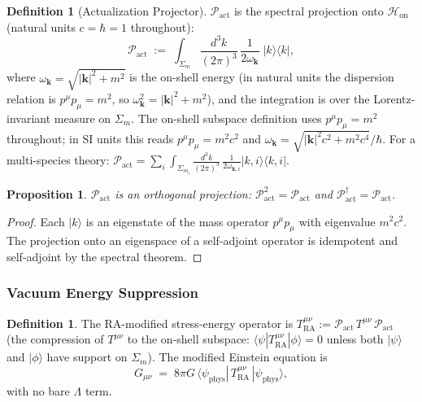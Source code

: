\documentclass[11pt,a4paper]{article}
\theoremstyle{plain}
\newtheorem{proposition}[theorem]{Proposition}
\theoremstyle{definition}
\newtheorem{definition}[theorem]{Definition}
\theoremstyle{remark}
\newcommand{\Pact}{\mathcal{P}_{\mathrm{act}}}
\newcommand{\Hon}{\mathcal{H}_{\mathrm{on}}}
\newcommand{\Sigmam}{\Sigma_{m}}
\newcommand{\Tact}{T^{\mu\nu}_{\mathrm{RA}}}
\newcommand{\ket}[1]{|#1\rangle}
\newcommand{\bra}[1]{\langle #1|}
\begin{document}
\begin{definition}[Actualization Projector]
$\Pact$ is the spectral projection onto $\Hon$ (natural units $c = \hbar = 1$
throughout):
\begin{equation}
  \Pact
  \;:=\;
  \int_{\Sigmam} \frac{d^{3}k}{(2\pi)^{3}}\,\frac{1}{2\omega_{\mathbf{k}}}
  \;\ket{k}\!\bra{k},
\end{equation}
where $\omega_{\mathbf{k}} = \sqrt{|\mathbf{k}|^{2} + m^{2}}$ is the
on-shell energy (in natural units the dispersion relation is
$p^{\mu}p_{\mu} = m^{2}$, so $\omega_{\mathbf{k}}^{2} = |\mathbf{k}|^2 + m^2$),
and the integration is over the Lorentz-invariant measure on $\Sigmam$.
The on-shell subspace definition uses $p^{\mu}p_{\mu} = m^{2}$ throughout;
in SI units this reads $p^{\mu}p_{\mu} = m^{2}c^{2}$ and
$\omega_{\mathbf{k}} = \sqrt{|\mathbf{k}|^{2}c^{2} + m^{2}c^{4}}/\hbar$.
For a multi-species theory:
$\Pact = \sum_{i} \int_{\Sigma_{m_{i}}} \frac{d^{3}k}{(2\pi)^{3}}\,
\frac{1}{2\omega_{\mathbf{k},i}} \ket{k,i}\!\bra{k,i}$.
\end{definition}

\begin{proposition}
$\Pact$ is an orthogonal projection: $\Pact^{2} = \Pact$ and
$\Pact^{\dagger} = \Pact$.
\end{proposition}
\begin{proof}
Each $\ket{k}$ is an eigenstate of the mass operator $p^{\mu}p_{\mu}$ with
eigenvalue $m^{2}c^{2}$. The projection onto an eigenspace of a self-adjoint
operator is idempotent and self-adjoint by the spectral theorem.
\end{proof}

\subsubsection{Vacuum Energy Suppression}

\begin{definition}
The RA-modified stress-energy operator is $\Tact := \Pact\,T^{\mu\nu}\,\Pact$
(the compression of $T^{\mu\nu}$ to the on-shell subspace: $\bra{\psi}\Tact\ket{\phi} = 0$
unless both $\ket{\psi}$ and $\ket{\phi}$ have support on $\Sigmam$).
The modified Einstein equation is
\begin{equation}
  G_{\mu\nu}
  \;=\;
  8\pi G\,\langle\psi_{\mathrm{phys}}|\,\Tact\,|\psi_{\mathrm{phys}}\rangle,
\end{equation}
with no bare $\Lambda$ term.
\end{definition}
\end{document}
